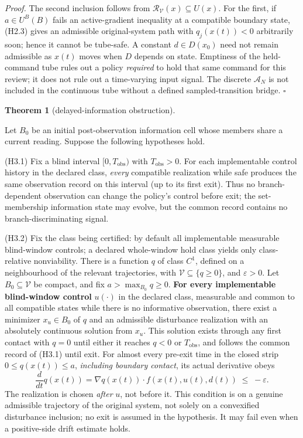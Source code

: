 \documentclass[11pt]{article}
\theoremstyle{definition}
\newtheorem{theorem}{Theorem}
\begin{document}
\emph{Proof.} The second inclusion follows from \(\mathcal R_{\mathcal V}(x)\subseteq U(x)\). For the first, if \(a\in U^B(B)\) fails an active-gradient inequality at a compatible boundary state, (H2.3) gives an admissible original-system path with \(q_j(x(t))<0\) arbitrarily soon; hence it cannot be tube-safe. A constant \(d\in D(x_0)\) need not remain admissible as \(x(t)\) moves when \(D\) depends on state. Emptiness of the held-command tube rules out a policy \emph{required} to hold that same command for this review; it does not rule out a time-varying input signal. The discrete \(\mathcal A_N\) is not included in the continuous tube without a defined sampled-transition bridge. \ensuremath{\square}

\begin{theorem}[delayed-information obstruction]\label{thm:delayed}

Let \(B_0\) be an initial post-observation information cell whose
members share a current reading. Suppose the following
hypotheses hold.

(H3.1) Fix a blind interval \([0,T_{\mathrm{obs}})\) with
\(T_{\mathrm{obs}}>0\). For each implementable control history in the
declared class, \emph{every} compatible realization while safe produces
the same observation record on this interval (up to its first exit).
Thus no branch-dependent observation can change the policy's control
before exit; the set-membership information state may evolve, but the
common record contains no branch-discriminating signal.

(H3.2) Fix the class being certified: by default all implementable measurable blind-window controls; a declared whole-window hold class yields only class-relative nonviability. There is a function \(q\) of class \(C^1\), defined on a neighbourhood of
the relevant trajectories, with \(\mathcal V\subseteq\{q\ge0\}\),
and \(\varepsilon>0\). Let \(B_0\subseteq\mathcal V\) be compact,
and fix \(a>\max_{B_0}q\ge0\).
\textbf{For every implementable blind-window control} \(u(\cdot)\) in the
declared class, measurable and common to all compatible states while
there is no informative observation, there exist a minimizer
\(x_u\in B_0\) of \(q\) and an admissible disturbance realization
with an absolutely continuous solution from \(x_u\). This solution
exists through any first contact with \(q=0\) until either it reaches
\(q<0\) or \(T_{\mathrm{obs}}\), and follows the common record
of (H3.1) until exit. For almost every pre-exit time in the closed strip
\(0\le q(x(t))\le a\), \emph{including boundary contact},
its actual derivative obeys
\[\frac{d}{dt}q(x(t))=\nabla q(x(t))\cdot f(x(t),u(t),d(t))
\;\le\;-\varepsilon. \tag{2}\]
The realization is chosen \emph{after} \(u\), not before it. This
condition is on a genuine admissible trajectory of the original system,
not solely on a convexified disturbance inclusion; no exit is assumed
in the hypothesis. It may fail even when a positive-side drift estimate
holds.


\end{theorem}
\end{document}
